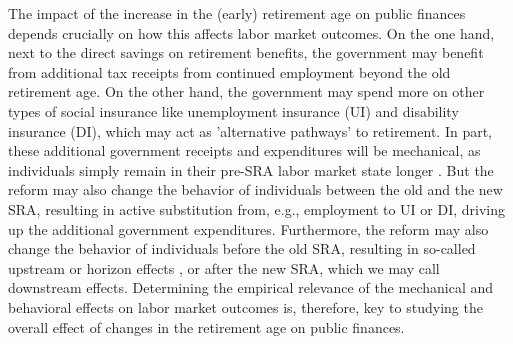 \documentclass[12pt,a4paper]{article}
\begin{document}
The impact of the increase in the (early) retirement age on public finances depends crucially on how this affects labor market outcomes. On the one hand, next to the direct savings on retirement benefits, the government may benefit from additional tax receipts from continued employment beyond the old retirement age. On the other hand, the government may spend more on other types of social insurance like unemployment insurance (UI) and disability insurance (DI), which may act as 'alternative pathways' to retirement. In part, these additional government receipts and expenditures will be mechanical, as individuals simply remain in their pre-SRA labor market state longer \citep{staubli_does_2013,manoli_effects_2018,oguzoglu_et_al_2020,geyer_closing_2021}. But the reform may also change the behavior of individuals between the old and the new SRA, resulting in active substitution from, e.g., employment to UI or DI, driving up the additional government expenditures. Furthermore, the reform may also change the behavior of individuals before the old SRA, resulting in so-called upstream or horizon effects \citep{hairault_distance_2010,jacobs_2010}, or after the new SRA, which we may call downstream effects.    
Determining the empirical relevance of the mechanical and behavioral effects on labor market outcomes is, therefore, key to studying the overall effect of changes in the retirement age on public finances. 

\end{document}
